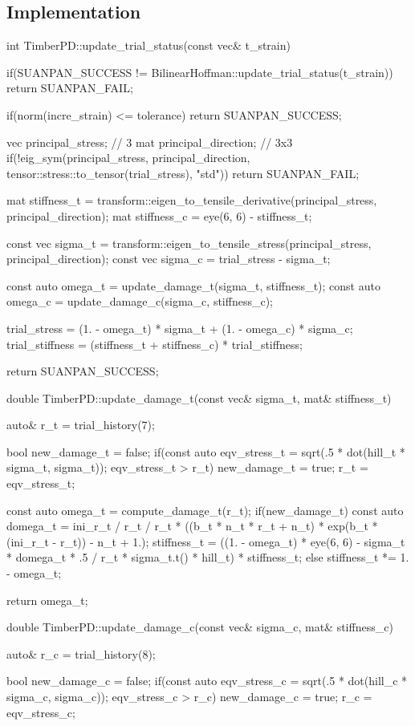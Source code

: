 \subsection{Implementation}
\begin{cppcode}
int TimberPD::update_trial_status(const vec& t_strain) {
    if(SUANPAN_SUCCESS != BilinearHoffman::update_trial_status(t_strain)) return SUANPAN_FAIL;

    if(norm(incre_strain) <= tolerance) return SUANPAN_SUCCESS;

    vec principal_stress;    // 3
    mat principal_direction; // 3x3
    if(!eig_sym(principal_stress, principal_direction, tensor::stress::to_tensor(trial_stress), "std")) return SUANPAN_FAIL;

    mat stiffness_t = transform::eigen_to_tensile_derivative(principal_stress, principal_direction);
    mat stiffness_c = eye(6, 6) - stiffness_t;

    const vec sigma_t = transform::eigen_to_tensile_stress(principal_stress, principal_direction);
    const vec sigma_c = trial_stress - sigma_t;

    const auto omega_t = update_damage_t(sigma_t, stiffness_t);
    const auto omega_c = update_damage_c(sigma_c, stiffness_c);

    trial_stress = (1. - omega_t) * sigma_t + (1. - omega_c) * sigma_c;
    trial_stiffness = (stiffness_t + stiffness_c) * trial_stiffness;

    return SUANPAN_SUCCESS;
}

double TimberPD::update_damage_t(const vec& sigma_t, mat& stiffness_t) {
    auto& r_t = trial_history(7);

    bool new_damage_t = false;
    if(const auto eqv_stress_t = sqrt(.5 * dot(hill_t * sigma_t, sigma_t)); eqv_stress_t > r_t) {
        new_damage_t = true;
        r_t = eqv_stress_t;
    }

    const auto omega_t = compute_damage_t(r_t);
    if(new_damage_t) {
        const auto domega_t = ini_r_t / r_t / r_t * ((b_t * n_t * r_t + n_t) * exp(b_t * (ini_r_t - r_t)) - n_t + 1.);
        stiffness_t = ((1. - omega_t) * eye(6, 6) - sigma_t * domega_t * .5 / r_t * sigma_t.t() * hill_t) * stiffness_t;
    }
    else stiffness_t *= 1. - omega_t;

    return omega_t;
}

double TimberPD::update_damage_c(const vec& sigma_c, mat& stiffness_c) {
    auto& r_c = trial_history(8);

    bool new_damage_c = false;
    if(const auto eqv_stress_c = sqrt(.5 * dot(hill_c * sigma_c, sigma_c)); eqv_stress_c > r_c) {
        new_damage_c = true;
        r_c = eqv_stress_c;
    }

}
\end{cppcode}
